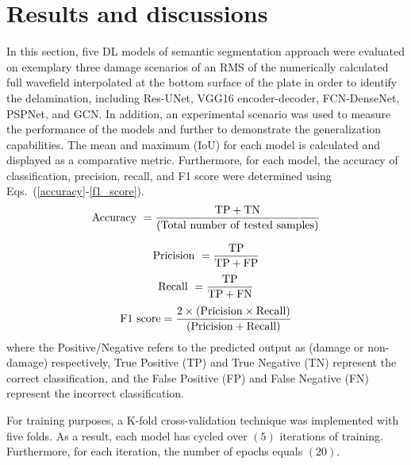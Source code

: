\section{Results and discussions}
\label{section:results_and_discussions}
In this section, five DL models of semantic segmentation approach were evaluated on exemplary three damage scenarios of an RMS of the numerically calculated full wavefield interpolated at the bottom surface of the plate in order to identify the delamination, including Res-UNet, VGG16 encoder-decoder, FCN-DenseNet, PSPNet, and GCN.
In addition, an experimental scenario was used to measure the performance of the models and further to demonstrate the generalization capabilities.
The mean and maximum (IoU) for each model is calculated and displayed as a comparative metric.
Furthermore, for each model, the accuracy of classification, precision, recall, and F1 score were determined using Eqs.~(\ref{accuracy}-\ref{f1_score}).
\begin{equation}
	\rm Accuracy\ = \frac{TP+TN}{(Total\ number\ of\ tested\ samples)}
	\label{accuracy}
\end{equation}

\begin{equation}
	\rm Pricision\ =\frac{TP}{TP+FP}
	\label{pricisoin}
\end{equation}
\begin{equation}
	\rm Recall\ = \frac{TP}{TP+ FN}
	\label{recall}
\end{equation}
\begin{equation}
	\rm F1\ score =\frac{2 \times (Pricision\times Recall)}{(Pricision + Recall)} 
	\label{f1_score}
\end{equation}
where the Positive/Negative refers to the predicted output as (damage or non-damage) respectively, True Positive (TP) and True Negative (TN) represent the correct classification, and the False Positive (FP) and False Negative (FN) represent the incorrect classification.

For training purposes, a K-fold cross-validation technique was implemented with five folds. 
As a result, each model has cycled over \((5)\) iterations of training.
Furthermore, for each iteration, the number of epochs equals \((20)\).
